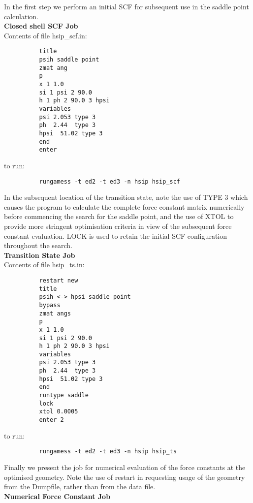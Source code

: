 \documentclass[11pt,fleqn]{article}
\begin{document}
In the first step we perform an initial SCF for subsequent use in the
saddle point calculation.\\

{\bf Closed shell SCF Job}\\

Contents of file hsip\_scf.in:
{
\footnotesize
\begin{verbatim}
          title
          psih saddle point
          zmat ang
          p
          x 1 1.0
          si 1 psi 2 90.0
          h 1 ph 2 90.0 3 hpsi
          variables
          psi 2.053 type 3
          ph  2.44  type 3
          hpsi  51.02 type 3
          end
          enter
\end{verbatim}
}
to run:
{
\footnotesize
\begin{verbatim}
          rungamess -t ed2 -t ed3 -n hsip hsip_scf
\end{verbatim}
}
In the subsequent location of the transition state, note
the use of TYPE 3 which causes the program
to calculate the complete force constant matrix numerically
before commencing the search for the saddle point, and the
use of XTOL to provide  more stringent optimisation criteria
in view of the subsequent force constant evaluation.
LOCK is used to retain the initial SCF  configuration 
throughout the search.\\

{\bf Transition State Job}\\

Contents of file hsip\_ts.in:
{
\footnotesize
\begin{verbatim}
          restart new
          title
          psih <-> hpsi saddle point
          bypass
          zmat angs
          p
          x 1 1.0
          si 1 psi 2 90.0
          h 1 ph 2 90.0 3 hpsi
          variables
          psi 2.053 type 3
          ph  2.44  type 3
          hpsi  51.02 type 3
          end
          runtype saddle
          lock
          xtol 0.0005
          enter 2
\end{verbatim}
}
to run:
{
\footnotesize
\begin{verbatim}
          rungamess -t ed2 -t ed3 -n hsip hsip_ts
\end{verbatim}
}
Finally we present the job for numerical evaluation of the
force constants at the optimised geometry. Note the use
of restart in requesting usage of the geometry from the
Dumpfile, rather than from the data file.\\

{\bf Numerical Force Constant Job}\\
\end{document}
